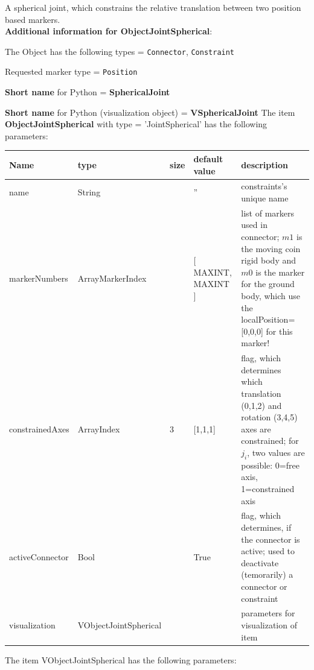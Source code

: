 \label{sec:item:ObjectJointSpherical}
A spherical joint, which constrains the relative translation between two position based markers.\vspace{12pt}
 \\{\bf Additional information for ObjectJointSpherical}:
\bi
  \item The Object has the following types = \texttt{Connector}, \texttt{Constraint}
  \item Requested marker type = \texttt{Position}
  \item {\bf Short name} for Python = {\bf SphericalJoint}  \item {\bf Short name} for Python (visualization object) = {\bf VSphericalJoint}\ei
\vspace{12pt} \noindent The item {\bf ObjectJointSpherical} with type = 'JointSpherical' has the following parameters:\vspace{-1cm}\\ 
\begin{center}
  \footnotesize
  \begin{longtable}{| p{4.5cm} | p{2.5cm} | p{0.5cm} | p{2.5cm} | p{6cm} |}
    \hline
    \bf Name & \bf type & \bf size & \bf default value & \bf description \\ \hline
    name &     String &      &     '' &     constraints's unique name\\ \hline
    markerNumbers &     ArrayMarkerIndex &     \tabnewline 2 &     [ MAXINT, MAXINT ] &     list of markers used in connector; $m1$ is the moving coin rigid body and $m0$ is the marker for the ground body, which use the localPosition=[0,0,0] for this marker!\\ \hline
    constrainedAxes &     ArrayIndex &     3 &     [1,1,1] &     flag, which determines which translation (0,1,2) and rotation (3,4,5) axes are constrained; for $j_i$, two values are possible: 0=free axis, 1=constrained axis\\ \hline
    activeConnector &     Bool &      &     True &     flag, which determines, if the connector is active; used to deactivate (temorarily) a connector or constraint\\ \hline
    visualization & VObjectJointSpherical & & & parameters for visualization of item \\ \hline
	  \end{longtable}
	\end{center}
The item VObjectJointSpherical has the following parameters:\vspace{-1cm}\\ 
